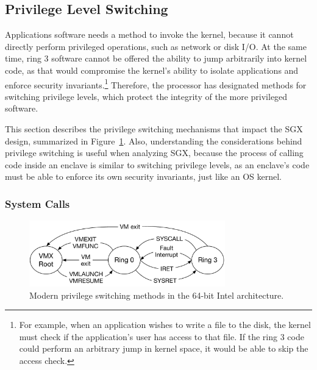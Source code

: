 \subsection{Privilege Level Switching}
\label{sec:privilege_switches}

Applications software needs a method to invoke the kernel, because it cannot
directly perform privileged operations, such as network or disk I/O. At the
same time, ring 3 software cannot be offered the ability to jump arbitrarily
into kernel code, as that would compromise the kernel's ability to isolate
applications and enforce security invariants.\footnote{For example, when an
application wishes to write a file to the disk, the kernel must check if the
application's user has access to that file. If the ring 3 code could perform
an arbitrary jump in kernel space, it would be able to skip the access check.}
Therefore, the processor has designated methods for switching privilege levels,
which protect the integrity of the more privileged software.

This section describes the privilege switching mechanisms that impact the SGX
design, summarized in Figure~\ref{fig:cpu_ring_switch}. Also, understanding the
considerations behind privilege switching is useful when analyzing SGX, because
the process of calling code inside an enclave is similar to switching privilege
levels, as an enclave's code must be able to enforce its own security
invariants, just like an OS kernel.


\subsubsection{System Calls}
\label{sec:syscalls}


\begin{figure}[hbt]
  \center
  \includegraphics[width=85mm]{figures/cpu_ring_switch.pdf}
  \caption{
    Modern privilege switching methods in the 64-bit Intel architecture.
  }
  \label{fig:cpu_ring_switch}
\end{figure}

